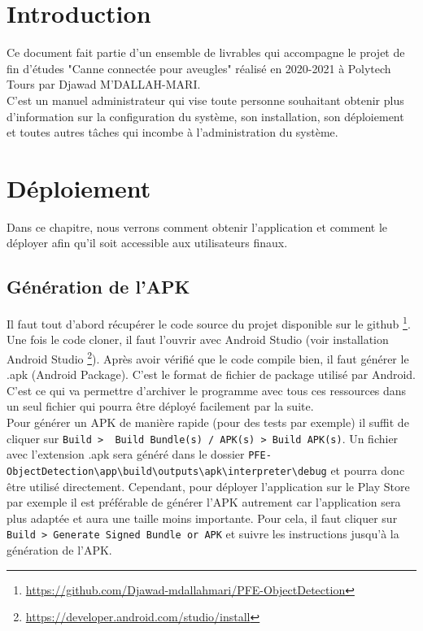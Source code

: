 \documentclass[UTF8]{EPURapport}
\begin{document}
\chapter{Introduction}

Ce document fait partie d'un ensemble de livrables qui accompagne le projet de fin d'études "Canne connectée pour aveugles" réalisé en 2020-2021 à Polytech Tours par Djawad M'DALLAH-MARI.\\

C'est un manuel administrateur qui vise toute personne souhaitant obtenir plus d'information sur la configuration du système, son installation, son déploiement et toutes autres tâches qui incombe à l'administration du système.

\chapter{Déploiement}
Dans ce chapitre, nous verrons comment obtenir l'application et comment le déployer afin qu'il soit accessible aux utilisateurs finaux.

\section{Génération de l'APK}\label{genapk}

Il faut tout d'abord récupérer le code source du projet disponible sur le github \footnote{\url{https://github.com/Djawad-mdallahmari/PFE-ObjectDetection}}. Une fois le code cloner, il faut l'ouvrir avec Android Studio (voir installation Android Studio \footnote{\url{https://developer.android.com/studio/install}}). Après avoir vérifié que le code compile bien, il faut générer le .apk (Android Package). C'est le format de fichier de package utilisé par Android. C'est ce qui va permettre d'archiver le programme avec tous ces ressources dans un seul fichier qui pourra être déployé facilement par la suite.\\
Pour générer un APK de manière rapide (pour des tests par exemple) il suffit de cliquer sur \verb|Build >  Build Bundle(s) / APK(s) > Build APK(s)|. Un fichier avec l'extension .apk sera généré dans le dossier \verb|PFE-ObjectDetection\app\build\outputs\apk\interpreter\debug| et pourra donc être utilisé directement. Cependant, pour déployer l'application sur le Play Store par exemple il est préférable de générer l'APK autrement car l'application sera plus adaptée et aura une taille moins importante. Pour cela, il faut cliquer sur \verb|Build > Generate Signed Bundle or APK| et suivre les instructions jusqu'à la génération de l'APK.
\end{document}
